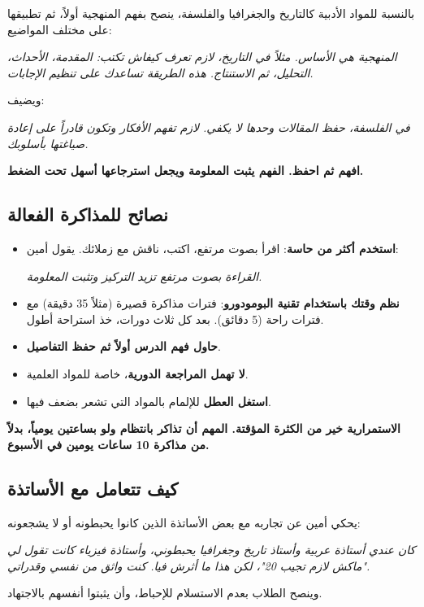 \documentclass[12pt,a4paper]{book}
\newcommand{\quoteAr}[1]{%
	\begin{myquote}
		\itshape #1
	\end{myquote}
}
\newcommand{\importantAr}[1]{%
	\begin{important}
		\bfseries #1
	\end{important}
}
\begin{document}
	بالنسبة للمواد الأدبية كالتاريخ والجغرافيا والفلسفة، ينصح بفهم المنهجية أولاً، ثم تطبيقها على مختلف المواضيع:
	
	\quoteAr{المنهجية هي الأساس. مثلاً في التاريخ، لازم تعرف كيفاش تكتب: المقدمة، الأحداث، التحليل، ثم الاستنتاج. هذه الطريقة تساعدك على تنظيم الإجابات.}
	
	ويضيف:
	\quoteAr{في الفلسفة، حفظ المقالات وحدها لا يكفي. لازم تفهم الأفكار وتكون قادراً على إعادة صياغتها بأسلوبك.}
	
	\importantAr{افهم ثم احفظ. الفهم يثبت المعلومة ويجعل استرجاعها أسهل تحت الضغط.}
	
	
	\subsection{نصائح للمذاكرة الفعالة}
	\label{sec:random-tips20}
	\label{sec:owner-experiences11}
	
	\begin{itemize}
		\item \textbf{استخدم أكثر من حاسة}: اقرأ بصوت مرتفع، اكتب، ناقش مع زملائك. يقول أمين:
		\quoteAr{ القراءة بصوت مرتفع تزيد التركيز وتثبت المعلومة.}
		\item \textbf{نظم وقتك باستخدام تقنية البومودورو}: فترات مذاكرة قصيرة (مثلاً 35 دقيقة) مع فترات راحة (5 دقائق). بعد كل ثلاث دورات، خذ استراحة أطول.
		\item \textbf{حاول فهم الدرس أولاً ثم حفظ التفاصيل}.
		\item \textbf{لا تهمل المراجعة الدورية}، خاصة للمواد العلمية.
		\item \textbf{استغل العطل} للإلمام بالمواد التي تشعر بضعف فيها.
	\end{itemize}
	
	\importantAr{الاستمرارية خير من الكثرة المؤقتة. المهم أن تذاكر بانتظام ولو بساعتين يومياً، بدلاً من مذاكرة 10 ساعات يومين في الأسبوع.}
	
	
	\subsection{كيف تتعامل مع الأساتذة}
	
	يحكي أمين عن تجاربه مع بعض الأساتذة الذين كانوا يحبطونه أو لا يشجعونه:
	
	\quoteAr{كان عندي أستاذة عربية وأستاذ تاريخ وجغرافيا يحبطوني، وأستاذة فيزياء كانت تقول لي "ماكش لازم تجيب 20"، لكن هذا ما أثرش فيا. كنت واثق من نفسي وقدراتي.}
	
	وينصح الطلاب بعدم الاستسلام للإحباط، وأن يثبتوا أنفسهم بالاجتهاد.
	
\end{document}

